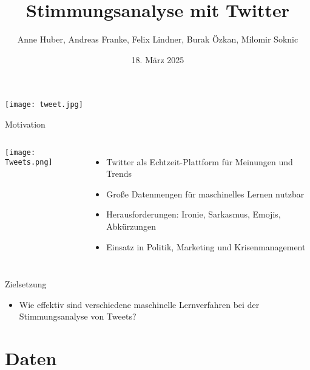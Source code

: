 \documentclass[aspectratio=169]{beamer} %
\title{Stimmungsanalyse mit Twitter}
\author[Team Twitter Sentiment]{Anne Huber, Andreas Franke, Felix Lindner, Burak Özkan, Milomir Soknic}
\institute{Projektpraktikum Web Science,\\Artificial Intelligence Group,\\Universität Hagen, Deutschland}
\date{18. März 2025}
\begin{document}
\begin{frame}
  \titlepage
\end{frame}

\begin{frame}
  \centering
  \texttt{[image: tweet.jpg]}
\end{frame}

\begin{frame}{Motivation}
  \begin{columns}
    \centering
    \texttt{[image: Tweets.png]}

    \begin{itemize}
        \item Twitter als Echtzeit-Plattform für Meinungen und Trends
        \item Große Datenmengen für maschinelles Lernen nutzbar
        \item Herausforderungen: Ironie, Sarkasmus, Emojis, Abkürzungen
        \item Einsatz in Politik, Marketing und Krisenmanagement
    \end{itemize}
  \end{columns}
\end{frame}

\begin{frame}{Zielsetzung}
  \Large
  \begin{itemize}
      \item Wie effektiv sind verschiedene maschinelle Lernverfahren bei der Stimmungsanalyse von Tweets?
  \end{itemize}
\end{frame}

\section{Daten}
\end{document}
